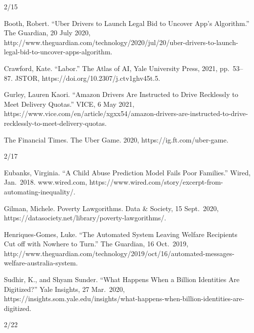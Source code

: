 \documentclass[
]{article}
\newlength{\cslhangindent}
\newlength{\cslentryspacingunit} %
\newenvironment{CSLReferences}[2] %
 {%
  \setlength{\parindent}{0pt}
  \ifodd #1
  \let\oldpar\par
  \def\par{\hangindent=\cslhangindent\oldpar}
  \fi
  \setlength{\parskip}{#2\cslentryspacingunit}
 }%
 {}
\begin{document}
2/15

\begin{CSLReferences}{0}{0}
Booth, Robert. ``Uber Drivers to Launch Legal Bid to Uncover App's
Algorithm.'' The Guardian, 20 July 2020,
http://www.theguardian.com/technology/2020/jul/20/uber-drivers-to-launch-legal-bid-to-uncover-apps-algorithm.

{}

Crawford, Kate. ``Labor.'' The Atlas of AI, Yale University Press, 2021,
pp.~53--87. JSTOR, https://doi.org/10.2307/j.ctv1ghv45t.5.

{}

Gurley, Lauren Kaori. ``Amazon Drivers Are Instructed to Drive
Recklessly to Meet Delivery Quotas.'' VICE, 6 May 2021,
https://www.vice.com/en/article/xgxx54/amazon-drivers-are-instructed-to-drive-recklessly-to-meet-delivery-quotas.

{}

The Financial Times. The Uber Game. 2020, https://ig.ft.com/uber-game.

{}

\end{CSLReferences}

2/17

\begin{CSLReferences}{0}{0}
Eubanks, Virginia. ``A Child Abuse Prediction Model Fails Poor
Families.'' Wired, Jan.~2018. www.wired.com,
https://www.wired.com/story/excerpt-from-automating-inequality/.

{}

Gilman, Michele. Poverty Lawgorithms. Data \& Society, 15 Sept.~2020,
https://datasociety.net/library/poverty-lawgorithms/.

{}

Henriques-Gomes, Luke. ``The Automated System Leaving Welfare Recipients
Cut off with Nowhere to Turn.'' The Guardian, 16 Oct.~2019,
http://www.theguardian.com/technology/2019/oct/16/automated-messages-welfare-australia-system.

{}

Sudhir, K., and Shyam Sunder. ``What Happens When a Billion Identities
Are Digitized?'' Yale Insights, 27 Mar.~2020,
https://insights.som.yale.edu/insights/what-happens-when-billion-identities-are-digitized.

{}

\end{CSLReferences}

2/22
\end{document}
